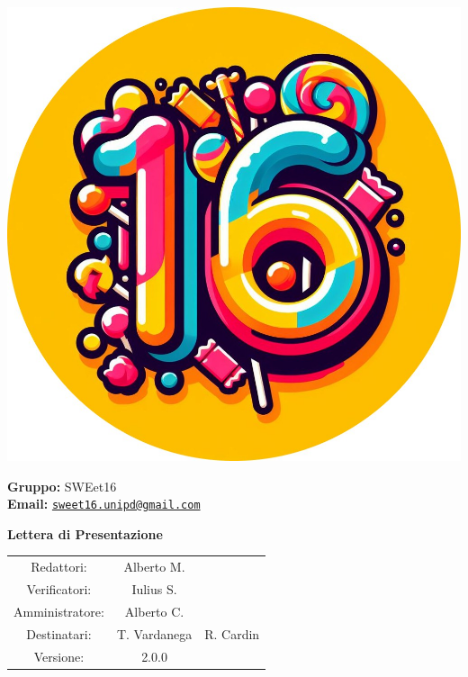 \documentclass[a4paper, 11pt]{article}
\begin{document}
\begin{minipage}{0.35\linewidth}
    \includegraphics[width=\linewidth]{logo rotondo.jpg}
\end{minipage}\hfil
\begin{minipage}{0.55\linewidth}
\textbf{Gruppo:} SWEet16 \\
\textbf{Email:} 
\href{mailto:sweet16.unipd@gmail.com}{\nolinkurl{sweet16.unipd@gmail.com}}
\end{minipage}

\vspace{15mm}

\begin{center}
\begin{Huge}
        \textbf{Lettera di Presentazione} \\
        \vspace{4mm}
        
\end{Huge}

\vspace{20mm}

\begin{large}
\begin{spacing}{1.4}
\begin{tabular}{c c c}
   Redattori:  &  Alberto M. & \\
   Verificatori: & Iulius S. & \\
   Amministratore: & Alberto C. & \\
   Destinatari: & T. Vardanega & R. Cardin \\  
   Versione: & 2.0.0 & 
\end{tabular}
\end{spacing}
\end{large}
\end{center}
\end{document}
